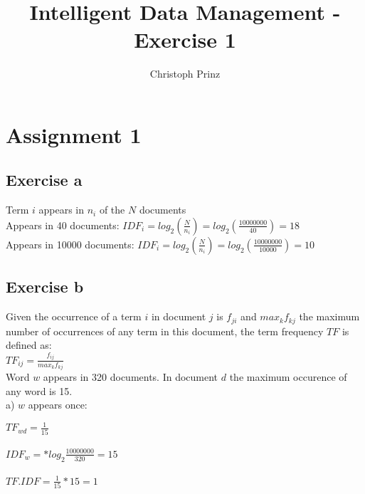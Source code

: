 \documentclass[]{scrartcl}
\title{Intelligent Data Management - Exercise 1}
\author{Christoph Prinz}
\begin{document}
\maketitle


\section*{Assignment 1}

\subsection*{Exercise a}

Term $i$ appears in $n_i$ of the $N$ documents \\

Appears in 40 documents:
$IDF_i = log_2(\frac{N}{n_i}) = log_2(\frac{10000000}{40}) = 18$\\

Appears in 10000 documents:
$IDF_i = log_2(\frac{N}{n_i}) = log_2(\frac{10000000}{10000}) = 10$ \\


\subsection*{Exercise b}

Given the occurrence of a term $i$ in document $j$ is $f_{ji}$ and $max_k f_{kj}$ the maximum number of occurrences of any term in this document, the term frequency $TF$ is defined as:\\

$TF_{ij} = \frac{f_{ij}}{max_k f_{kj}}$\\

Word $w$ appears in 320 documents. In document $d$ the maximum occurence of any word is 15. \\

a) $w$ appears once:\\
\begin{addmargin}[25pt]{0pt} 

 $TF_{wd} = \frac{1}{15}$\\\\
 $IDF_w = * log_2\frac{10000000}{320} = 15$\\\\
 $TF.IDF = \frac{1}{15} * 15 = 1$\\\\

\end{addmargin}
\end{document}
